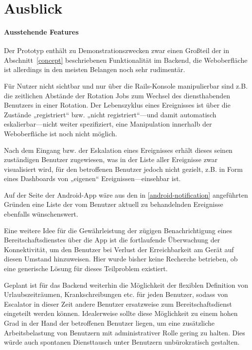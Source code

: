 \documentclass[11pt,utf8,notoc,bibnum,german,final]{zihpub}
\begin{document}
\section{Ausblick}

\paragraph{Ausstehende Features}

Der Prototyp enthält zu Demonstrationszwecken zwar einen Großteil der in
Abschnitt~\ref{concept} beschriebenen Funktionalität im Backend, die
Weboberfläche ist allerdings in den meisten Belangen noch sehr rudimentär.

Für Nutzer nicht sichtbar und nur über die Rails-Konsole manipulierbar sind
z.B. die zeitlichen Abstände der Rotation Jobs zum Wechsel des diensthabenden
Benutzers in einer Rotation. Der Lebenszyklus eines Ereignisses ist über die
Zustände „registriert“ bzw. „nicht registriert“—und damit automatisch
eskalierbar—nicht weiter spezifiziert, eine Manipulation innerhalb der
Weboberfläche ist noch nicht möglich.

Nach dem Eingang bzw. der Eskalation eines Ereignisses erhält dieses seinen
zuständigen Benutzer zugewiesen, was in der Liste aller Ereignisse zwar
visualisiert wird, für den betroffenen Benutzer jedoch nicht gezielt, z.B. in
Form eines Dashboards von „eigenen“ Ereignissen—einsehbar ist.

Auf der Seite der Android-App wäre aus den in \ref{android-notification}
angeführten Gründen eine Liste der vom Benutzer aktuell zu behandelnden
Ereignisse ebenfalls wünschenswert.

Eine weitere Idee für die Gewährleistung der zügigen Benachrichtigung eines
Bereitschaftsdienstes über die App ist die fortlaufende Überwachung der
Konnektivität, um den Benutzer bei Verlust der Erreichbarkeit am Gerät auf
diesen Umstand hinzuweisen. Hier wurde bisher keine Recherche betrieben, ob
eine generische Lösung für dieses Teilproblem existiert.

Geplant ist für das Backend weiterhin die Möglichkeit der flexiblen Definition
von Urlaubszeiträumen, Krankschreibungen etc. für jeden Benutzer, sodass von
Escalator in dieser Zeit andere Benutzer ersatzweise zum Bereitschaftsdienst
eingeteilt werden können. Idealerweise sollte diese Möglichkeit zu einem hohen
Grad in der Hand der betroffenen Benutzer liegen, um eine zusätzliche
Arbeitsbelastung von Benutzern mit administrativer Rolle gering zu halten. Dies
würde auch spontanen Diensttausch unter Benutzern unbürokratisch gestalten.
\end{document}
